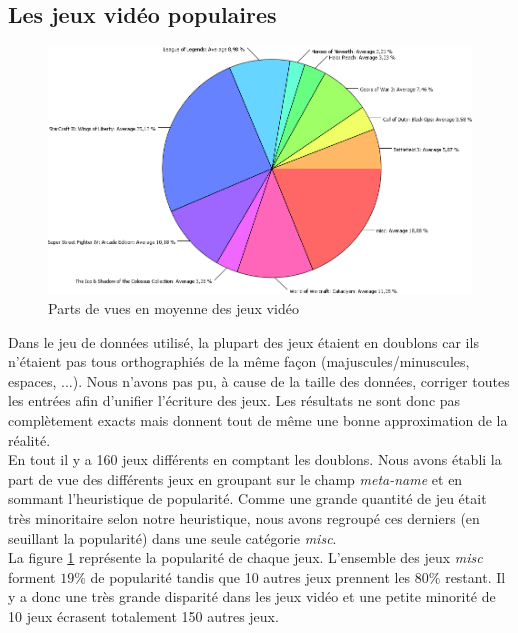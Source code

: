 \documentclass[11pt, a4paper, titlepage]{scrartcl}
\begin{document}
\subsection{Les jeux vidéo populaires}
\begin{figure}[h]
    \centering
    \includegraphics[scale=0.4]{images/main_games}
    \caption{Parts de vues en moyenne des jeux vidéo}
    \label{fig:main_games}
\end{figure}

Dans le jeu de données utilisé, la plupart des jeux étaient en doublons car ils
n'étaient pas tous orthographiés de la même façon (majuscules/minuscules,
espaces, ...). Nous n'avons pas pu, à cause de la taille des données, corriger
toutes les entrées afin d'unifier l'écriture des jeux. Les résultats ne sont
donc pas complètement exacts mais donnent tout de même une bonne approximation
de la réalité. \\

En tout il y a 160 jeux différents en comptant les doublons. Nous avons établi
la part de vue des différents jeux en groupant sur le champ \textit{meta-name}
et en sommant l'heuristique de popularité. Comme une grande quantité de jeu
était très minoritaire selon notre heuristique, nous avons regroupé ces
derniers (en seuillant la popularité) dans une seule catégorie \textit{misc}. \\

La figure \ref{fig:main_games} représente la popularité de chaque jeux.
L'ensemble des jeux \textit{misc} forment $19\%$ de popularité tandis que 10
autres jeux prennent les $80\%$ restant. Il y a donc une très grande disparité
dans les jeux vidéo et une petite minorité de 10 jeux écrasent totalement 150
autres jeux.
\end{document}

